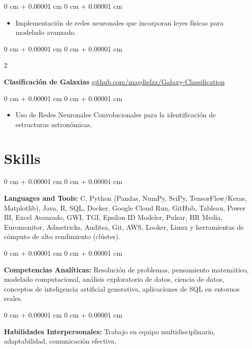 \documentclass[10pt, letterpaper]{article}
\newenvironment{highlights}{
    \begin{itemize}[
        topsep=0.10 cm,
        parsep=0.10 cm,
        partopsep=0pt,
        itemsep=0pt,
        leftmargin=0 cm + 10pt
    ]
}{
    \end{itemize}
} %
\newenvironment{onecolentry}{
    \begin{adjustwidth}{
        0 cm + 0.00001 cm
    }{
        0 cm + 0.00001 cm
    }
}{
    \end{adjustwidth}
} %
\newenvironment{twocolentry}[2][]{
    \onecolentry
    \def\secondColumn{#2}
    \setcolumnwidth{\fill, 4.5 cm}
    \begin{paracol}{2}
}{
    \switchcolumn \raggedleft \secondColumn
    \end{paracol}
    \endonecolentry
} %
\begin{document}
        \vspace{0.10 cm}
        \begin{onecolentry}
            \begin{highlights}
                \item Implementación de redes neuronales que incorporan leyes físicas para modelado avanzado.
            \end{highlights}
        \end{onecolentry}

        \vspace{0.2 cm}

        \begin{twocolentry}{
            \href{https://github.com/magdielzz/Clasificaci-n-de-galaxias-con-estructura-de-marea-y-sin-estructura-de-marea}{github.com/magdielzz/Galaxy-Classification}
        }
            \textbf{Clasificación de Galaxias}\end{twocolentry}

        \vspace{0.10 cm}
        \begin{onecolentry}
            \begin{highlights}
                \item Uso de Redes Neuronales Convolucionales para la identificación de estructuras astronómicas.
            \end{highlights}
        \end{onecolentry}

    \section{Skills}
        
        \begin{onecolentry}
            \textbf{Languages and Tools:} C, Python (Pandas, NumPy, SciPy, TensorFlow/Keras, Matplotlib), Java, R, SQL, Docker, Google Cloud Run, GitHub, Tableau, Power BI, Excel Avanzado, GWI, TGI, Epsilon ID Modeler, Pulsar, HR Media, Euromonitor, Admetricks, Auditsa, Git, AWS, Looker, Linux y herramientas de cómputo de alto rendimiento (clúster).
        \end{onecolentry}

        \vspace{0.2 cm}

        \begin{onecolentry}
            \textbf{Competencias Analíticas:} Resolución de problemas, pensamiento matemático, modelado computacional, análisis exploratorio de datos, ciencia de datos, conceptos de inteligencia artificial generativa, aplicaciones de SQL en entornos reales.
            
        \end{onecolentry}

        \vspace{0.2 cm}

        \begin{onecolentry}
            \textbf{Habilidades Interpersonales:} Trabajo en equipo multidisciplinario, adaptabilidad, comunicación efectiva, 
        \end{onecolentry}
\end{document}
